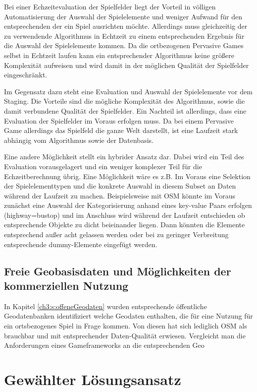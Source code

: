 Bei einer Echzeitevaluation der Spielfelder liegt der Vorteil in völligen Automatisierung der Auswahl der Spielelemente und weniger Aufwand für den entsprechenden der ein Spiel ausrichten möchte. Allerdings muss gleichzeitig der zu verwendende Algorithmus in Echtzeit zu einem entsprechenden Ergebnis für die Auswahl der Spielelemente kommen. Da die ortbezogenen Pervasive Games selbst in Echtzeit laufen kann ein entsprechender Algorithmus keine größere Komplexität aufweisen und wird damit in der möglichen Qualität der Spielfelder eingeschränkt.

Im Gegensatz dazu steht eine Evaluation und Auswahl der Spielelemente vor dem Staging. Die Vorteile sind die mögliche Komplexität des Algorithmus, sowie die damit verbundene Qualität der Spielfelder. Ein Nachteil ist allerdings, dass eine Evaluation der Spielfelder im Voraus erfolgen muss. Da bei einem Pervasive Game allerdings das Spielfeld die ganze Welt darstellt, ist eine Laufzeit stark abhängig vom Algorithmus sowie der Datenbasis.

Eine andere Möglichkeit stellt ein hybrider Ansatz dar. Dabei wird ein Teil des Evaluation vorausgelagert und ein weniger komplexer Teil für die Echzeitberechnung übrig. Eine Möglichkeit wäre es z.B. Im Voraus eine Selektion der Spielelementtypen und die konkrete Auswahl in diesem Subset an Daten während der Laufzeit zu machen. Beispielsweise mit OSM könnte im Voraus zunächst eine Auswahl der Kategorisierung anhand eines key-value Paars erfolgen (highway=bustop) und im Anschluss wird während der Laufzeit entschieden ob entsprechende Objekte zu dicht beieinander liegen. Dann könnten die Elemente entsprechend außer acht gelassen werden oder bei zu geringer Verbreitung entsprechende dummy-Elemente eingefügt werden.

\subsection*{Freie Geobasisdaten und Möglichkeiten der kommerziellen Nutzung}

In Kapitel \ref{ch3:s:offeneGeodaten} wurden entsprechende öffentliche Geodatenbanken identifiziert welche Geodaten enthalten, die für eine Nutzung für ein ortsbezogenes Spiel in Frage kommen. Von diesen hat sich lediglich OSM als brauchbar und mit entsprechender Daten-Qualität erwiesen.
Vergleicht man die Anforderungen eines Gameframeworks an die entsprechenden Geo

\section{Gewählter Lösungsansatz}


